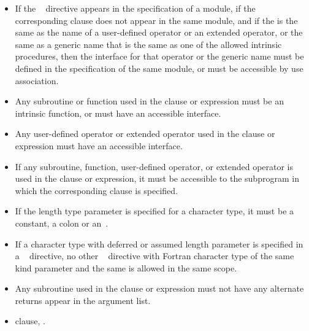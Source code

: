 \begin{itemize}
\item If the ~ directive appears in the specification of a module, if the corresponding  clause does not appear in the same module, and if the  is the same as the name of a user-defined operator or an extended operator, or the same as a generic name that is the same as one of the allowed intrinsic procedures, then the interface for that operator or the generic name must be defined in the specification of the same module, or must be accessible by use association. 

\item Any subroutine or function used in the  clause or  expression must be an intrinsic function, or must have an accessible interface. 

\item Any user-defined operator or extended operator used in the  clause or  expression must have an accessible interface. 

\item If any subroutine, function, user-defined operator, or extended operator is used in the  clause or  expression, it must be accessible to the subprogram in which the corresponding  clause is specified. 

\item If the length type parameter is specified for a character type, it must be a constant, a colon or an~\code{*}. 

\item If a character type with deferred or assumed length parameter is specified in a ~ directive, no other ~ directive with Fortran character type of the same kind parameter and the same  is allowed in the same scope.

\item Any subroutine used in the  clause or  expression must not have any alternate returns appear in the argument list.
\fortranspecificend
\end{itemize}

\crossreferences
\begin{itemize}
\item {} clause, 
.
\end{itemize}










